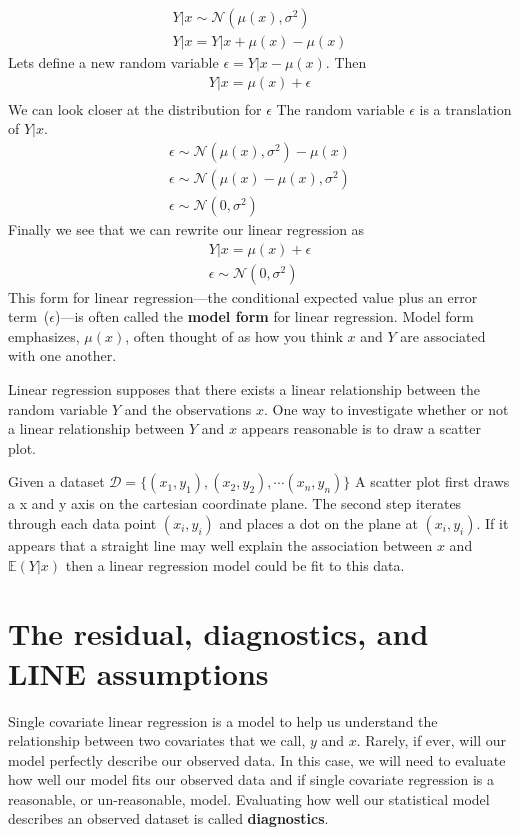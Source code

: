 \begin{align}
    Y |x \sim \mathcal{N}(\mu(x), \sigma^{2}) \\ 
    Y |x  = Y |x + \mu(x) - \mu(x)
\end{align}
Lets define a new random variable $\epsilon =  Y |x - \mu(x)$. 
Then 
\begin{align}
    Y |x  = \mu(x) + \epsilon\\
\end{align}
We can look closer at the distribution for $\epsilon$
The random variable $\epsilon$ is a translation of $Y|x$. 
\begin{align}
    \epsilon \sim \mathcal{N}(\mu(x), \sigma^{2}) - \mu(x)\\
    \epsilon \sim \mathcal{N}(\mu(x)-\mu(x), \sigma^{2}) \\
    \epsilon \sim \mathcal{N}(0, \sigma^{2}) 
\end{align}
Finally we see that we can rewrite our linear regression as 
\begin{align}
    Y |x  = \mu(x) + \epsilon\\
    \epsilon \sim \mathcal{N}(0, \sigma^{2})
\end{align}
This form for linear regression---the conditional expected value plus an error term~($\epsilon$)---is often called the \textbf{model form} for linear regression.
Model form emphasizes, $\mu(x)$, often thought of as how you think $x$ and $Y$ are associated with one another.

Linear regression supposes that there exists a linear relationship between the random variable $Y$ and the observations $x$. 
One way to investigate whether or not a linear relationship between $Y$ and $x$ appears reasonable is to draw a scatter plot. 

Given a dataset $\mathcal{D} = \{ (x_{1}, y_{1}),(x_{2}, y_{2}), \cdots (x_{n}, y_{n}) \}$
A scatter plot first draws a x and y axis on the cartesian coordinate plane. 
The second step iterates through each data point $(x_{i},y_{i})$ and places a dot on the plane at $(x_{i},y_{i})$. If it appears that a straight line may well explain the association between $x$ and $\mathbb{E}(Y|x)$ then a linear regression model could be fit to this data. 

\section{The residual, diagnostics, and LINE assumptions}

Single covariate linear regression is a model to help us understand the relationship between two covariates that we call, $y$ and $x$. 
Rarely, if ever, will our model perfectly describe our observed data. 
In this case, we will need to evaluate how well our model fits our observed data and if single covariate regression is a reasonable, or un-reasonable, model.
Evaluating how well our statistical model describes an observed dataset is called \textbf{diagnostics}.

